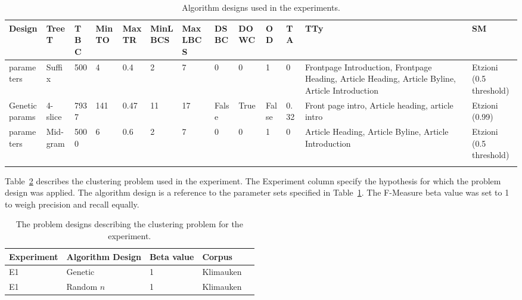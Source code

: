 \begin{landscape}
\begin{center}
\footnotesize
  \begin{longtable}{|p{1.5cm}|p{1.5cm}|p{1cm}|p{1.5cm}|p{1.5cm}|p{1.5cm}|p{1.5cm}|p{1.2cm}|p{1.5cm}|p{0.8cm}|p{1cm}|p{2.5cm}|p{1.5cm}|}
  \hline
  Design & TreeT & TBC & MinTO & MaxTR & MinLBCS & MaxLBCS & DSBC & DOWC & OD & TA & TTy & SM\\
  \hline
  \endhead
  \citeauthor{Oren1998} parameters & Suffix & 500 & 4 & 0.4 & 2 & 7 & 0 & 0 & 1 & 0 & Frontpage Introduction, Frontpage Heading, Article Heading, Article Byline, Article Introduction & Etzioni (0.5 threshold)\\
  \hline
  Genetic params & 4-slice & 7937 & 141 & 0.47 & 11 & 17 & False & True & False & 0.32 & Front page intro, Article heading, article intro & Etzioni (0.99) \\
  \hline
  \citeauthor{Moe2014compact} parameters & Mid-gram & 5000 & 6 & 0.6 & 2 & 7 & 0 & 0 & 1 & 0 & Article Heading, Article Byline, Article Introduction & Etzioni (0.5 threshold)\\
  \hline
    \caption{Algorithm designs used in the experiments.}
	\label{tab:algorithmdesign}
  \end{longtable}
\end{center}
\end{landscape}

Table~\ref{tab:problemdesign} describes the clustering problem used in the experiment. The Experiment column specify the hypothesis for which the problem design was applied. The algorithm design is a reference to the parameter sets specified in Table~\ref{tab:algorithmdesign}. The F-Measure beta value was set to 1 to weigh precision and recall equally.

\begin{table}
\small
\begin{center}
  \begin{tabular}{|l|p{2.5cm}|l|l|l|}
  \hline
  Experiment & Algorithm Design & Beta value & Corpus\\ 
  \hline
  E1 & Genetic & 1 & Klimauken\\
  \hline
  E1 & Random \(n\) & 1 & Klimauken\\
  \hline
  \end{tabular}
\end{center}
\caption{The problem designs describing the clustering problem for the experiment.}
\label{tab:problemdesign}
\end{table}

